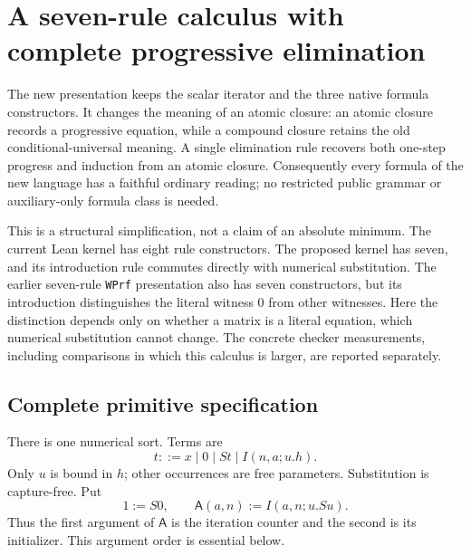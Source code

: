 \documentclass[11pt,a4paper]{article}
\theoremstyle{definition}\newtheorem{definition}[theorem]{Definition}
\newcommand{\llbracket}{\mathopen{[\![}}
\newcommand{\rrbracket}{\mathclose{]\!]}}
\begin{document}
\providecommand{\llbracket}{[\![}
\providecommand{\rrbracket}{]\!]}
\section{A seven-rule calculus with complete progressive elimination}
\label{sec:new-calculus}

The new presentation keeps the scalar iterator and the three native formula
constructors.  It changes the meaning of an atomic closure: an atomic closure
records a progressive equation, while a compound closure retains the old
conditional-universal meaning.  A single elimination rule recovers both
one-step progress and induction from an atomic closure.  Consequently every
formula of the new language has a faithful ordinary reading; no restricted
public grammar or auxiliary-only formula class is needed.

This is a structural simplification, not a claim of an absolute minimum.  The
current Lean kernel has eight rule constructors.  The proposed kernel has
seven, and its introduction rule commutes directly with numerical
substitution.  The earlier seven-rule \texttt{WPrf} presentation also has seven
constructors, but its introduction distinguishes the literal witness $0$ from
other witnesses.  Here the distinction depends only on whether a matrix is a
literal equation, which numerical substitution cannot change.  The concrete
checker measurements, including comparisons in which this calculus is larger,
are reported separately.\cite{native,witness}

\subsection{Complete primitive specification}
\label{subsec:new-specification}

There is one numerical sort.  Terms are
\[
 t ::= x\mid 0\mid St\mid I(n,a;u.h).
\]
Only $u$ is bound in $h$; other occurrences are free parameters.  Substitution
is capture-free.  Put
\begin{equation}
 1:=S0,\qquad
 \mathsf A(a,n):=I(a,n;u.Su).
 \label{eq:new-add}
\end{equation}
Thus the first argument of $\mathsf A$ is the iteration counter and the
second is its initializer.  This argument order is essential below.
\end{document}
